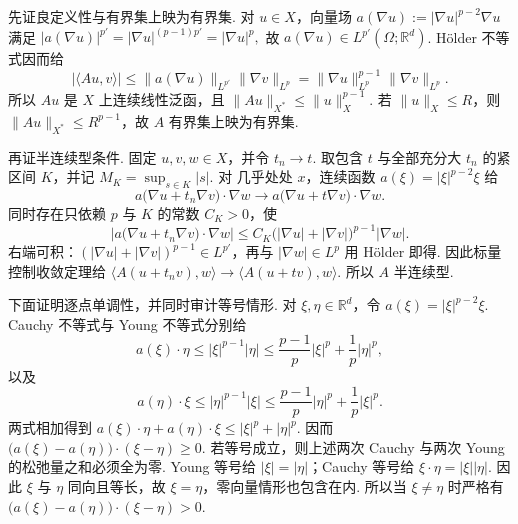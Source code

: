 \begin{FAProof}
先证良定义性与有界集上映为有界集. 对 \(\displaystyle u\in X\)，向量场
\(\displaystyle a(\nabla u) := |\nabla u|^{p-2}\nabla u\)
满足
\(\displaystyle |a(\nabla u)|^{p'} = |\nabla u|^{(p-1)p'} = |\nabla u|^p,\)
故 \(\displaystyle a(\nabla u)\in L^{p'}(\Omega;\mathbb R^d)\). Hölder 不等式因而给
\[
|\langle Au,v\rangle|
\leqslant
\|a(\nabla u)\|_{L^{p'}}
\|\nabla v\|_{L^p}
=
\|\nabla u\|_{L^p}^{p-1}
\|\nabla v\|_{L^p}.
\]
所以 \(\displaystyle Au\) 是 \(\displaystyle X\) 上连续线性泛函，且
\(\displaystyle \|Au\|_{X^*} \leqslant \|u\|_X^{p-1}.\)
若 \(\displaystyle\|u\|_X\leqslant R\)，则 \(\displaystyle\|Au\|_{X^*}\leqslant R^{p-1}\)，故 \(\displaystyle A\) 有界集上映为有界集.

再证半连续型条件. 固定 \(\displaystyle u,v,w\in X\)，并令 \(\displaystyle t_n\to t\). 取包含 \(\displaystyle t\) 与全部充分大 \(\displaystyle t_n\) 的紧区间 \(\displaystyle K\)，并记 \(\displaystyle M_K=\sup_{s\in K}|s|\). 对 几乎处处 \(\displaystyle x\)，连续函数 \(\displaystyle a(\xi)=|\xi|^{p-2}\xi\) 给
\[
a\bigl(\nabla u+t_n\nabla v\bigr)\cdot\nabla w
\longrightarrow
a\bigl(\nabla u+t\nabla v\bigr)\cdot\nabla w.
\]
同时存在只依赖 \(\displaystyle p\) 与 \(\displaystyle K\) 的常数 \(\displaystyle C_K>0\)，使
\[
\left|
a\bigl(\nabla u+t_n\nabla v\bigr)\cdot\nabla w
\right|
\leqslant
C_K
\bigl(|\nabla u|+|\nabla v|\bigr)^{p-1}
|\nabla w|.
\]
右端可积：\(\displaystyle(|\nabla u|+|\nabla v|)^{p-1}\in L^{p'}\)，再与 \(\displaystyle|\nabla w|\in L^p\) 用 Hölder 即得. 因此标量控制收敛定理给
\(\displaystyle \langle A(u+t_nv),w\rangle \longrightarrow \langle A(u+tv),w\rangle.\)
所以 \(\displaystyle A\) 半连续型.

下面证明逐点单调性，并同时审计等号情形. 对 \(\displaystyle\xi,\eta\in\mathbb R^d\)，令 \(\displaystyle a(\xi)=|\xi|^{p-2}\xi\). Cauchy 不等式与 Young 不等式分别给
\[
a(\xi)\cdot\eta
\leqslant
|\xi|^{p-1}|\eta|
\leqslant
\frac{p-1}{p}|\xi|^p
+
\frac{1}{p}|\eta|^p,
\]
以及
\[
a(\eta)\cdot\xi
\leqslant
|\eta|^{p-1}|\xi|
\leqslant
\frac{p-1}{p}|\eta|^p
+
\frac{1}{p}|\xi|^p.
\]
两式相加得到
\(\displaystyle a(\xi)\cdot\eta+a(\eta)\cdot\xi \leqslant |\xi|^p+|\eta|^p.\)
因而
\(\displaystyle \bigl(a(\xi)-a(\eta)\bigr)\cdot(\xi-\eta) \geqslant0.\)
若等号成立，则上述两次 Cauchy 与两次 Young 的松弛量之和必须全为零. Young 等号给 \(\displaystyle|\xi|=|\eta|\)；Cauchy 等号给 \(\displaystyle\xi\cdot\eta=|\xi||\eta|\). 因此 \(\displaystyle\xi\) 与 \(\displaystyle\eta\) 同向且等长，故 \(\displaystyle\xi=\eta\)，零向量情形也包含在内. 所以当 \(\displaystyle\xi\neq\eta\) 时严格有
\(\displaystyle \bigl(a(\xi)-a(\eta)\bigr)\cdot(\xi-\eta)>0.\)


\end{FAProof}
